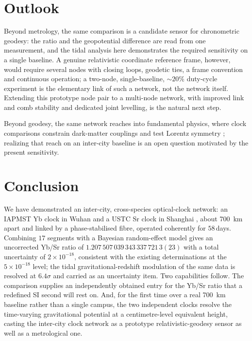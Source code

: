 \documentclass[11pt,a4paper]{article}
\newcommand{\e}[1]{\times 10^{#1}}
\begin{document}
\section{Outlook}
\label{sec:outlook}

Beyond metrology, the same comparison is a candidate sensor for
chronometric geodesy: the ratio and the geopotential difference are read
from one measurement, and the tidal analysis here demonstrates the
required sensitivity on a single baseline. A genuine relativistic
coordinate reference frame, however, would require several nodes with
closing loops, geodetic ties, a frame convention and continuous
operation; a two-node, single-baseline, $\sim20\%$ duty-cycle experiment
is the elementary link of such a network, not the network itself.
Extending this prototype node pair to a multi-node network, with improved
link and comb stability and dedicated joint levelling, is the natural
next step.

Beyond geodesy, the same network reaches into fundamental physics, where
clock comparisons constrain dark-matter couplings \citep{wcislo2018global,
roberts2017domain} and test Lorentz symmetry \citep{sanner2019lorentz};
realizing that reach on an inter-city baseline is an open question
motivated by the present sensitivity.

\section{Conclusion}
\label{sec:conclusion}

We have demonstrated an inter-city, cross-species optical-clock network:
an IAPMST Yb clock in Wuhan \citep{zhu2026yb} and a USTC Sr clock in
Shanghai \citep{jia2026sr}, about \qty{700}{km} apart and linked by a
phase-stabilised fibre, operated coherently for $58$\,days. Combining
$17$ segments with a Bayesian random-effect model gives an uncorrected
Yb/Sr ratio of $1.207\,507\,039\,343\,337\,721\,3(23)$ with a total
uncertainty of $2\e{-18}$, consistent with the existing determinations at
the $5\e{-18}$ level; the tidal gravitational-redshift modulation of the
same data is resolved at $6.4\sigma$ and carried as an uncertainty item.
Two capabilities follow. The comparison supplies an independently
obtained entry for the Yb/Sr ratio that a redefined SI second will rest
on. And, for the first time over a real \qty{700}{km} baseline rather than a
single campus, the two independent clocks resolve the time-varying
gravitational potential at a centimetre-level equivalent height, casting
the inter-city clock network as a prototype relativistic-geodesy sensor
as well as a metrological one.
\end{document}
